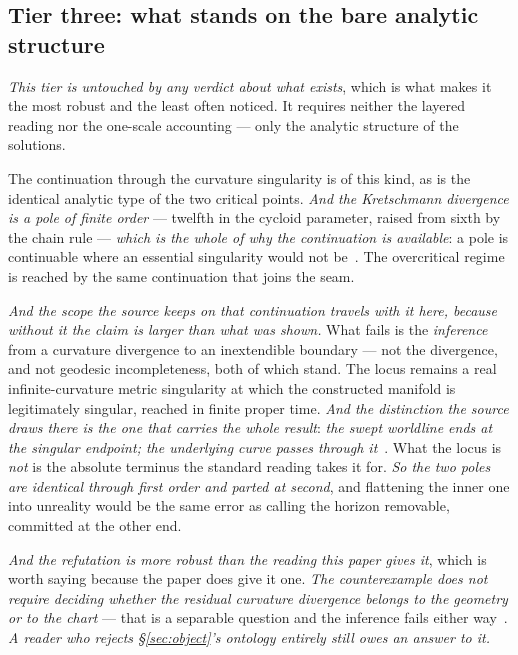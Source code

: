 \documentclass[11pt,a4paper]{article}
\theoremstyle{plain}
\theoremstyle{definition}
\begin{document}
\subsection{Tier three: what stands on the bare analytic structure}

\emph{This tier is untouched by any verdict about what exists}, which is what makes it the most robust and
the least often noticed. It requires neither the layered reading nor the one-scale accounting --- only the
analytic structure of the solutions.

The continuation through the curvature singularity is of this kind, as is the identical analytic type of the
two critical points. \emph{And the Kretschmann divergence is a pole of finite order} --- twelfth in the
cycloid parameter, raised from sixth by the chain rule --- \emph{which is the whole of why the continuation
is available}: a pole is continuable where an essential singularity would not be~\cite{JanzenCircle}. The
overcritical regime is reached by the same continuation that joins the seam.

\emph{And the scope the source keeps on that continuation travels with it here, because without it the claim
is larger than what was shown.} What fails is the \emph{inference} from a curvature divergence to an
inextendible boundary --- not the divergence, and not geodesic incompleteness, both of which stand. The locus
remains a real infinite-curvature metric singularity at which the constructed manifold is legitimately
singular, reached in finite proper time. \emph{And the distinction the source draws there is the one that
carries the whole result}: \emph{the swept worldline ends at the singular endpoint; the underlying curve
passes through it}~\cite{JanzenCircle}. What the locus is \emph{not} is the absolute terminus the standard
reading takes it for. \emph{So the two poles are identical through first order and parted at second}, and
flattening the inner one into unreality would be the same error as calling the horizon removable, committed
at the other end.

\emph{And the refutation is more robust than the reading this paper gives it}, which is worth saying because
the paper does give it one. \emph{The counterexample does not require deciding whether the residual curvature
divergence belongs to the geometry or to the chart} --- that is a separable question and the inference fails
either way~\cite{JanzenCircle}. \emph{A reader who rejects \S\ref{sec:object}'s ontology entirely still owes
an answer to it.}
\end{document}
